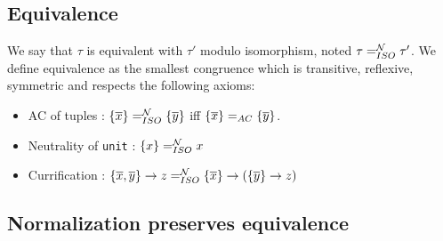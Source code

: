 \documentclass [a4paper,11pt]{scrartcl}
\newcommand{\N}{{\cal N}}
\newcommand\tlist{\overline}
\newcommand\tmset[1]{\{\overline{#1}\}}
\begin{document}
\subsection{Equivalence}

\newcommand\eqN{=^{\N}_{ISO}}
\newcommand\unifN{\equiv^{\N}_{ISO}}

We say that $\tau$ is equivalent with $\tau'$ modulo isomorphism, noted $\tau \eqN \tau'$. We define
equivalence as the smallest congruence which is transitive, reflexive, symmetric and respects the following axioms:


\begin{itemize}
\item AC of tuples : $\tmset{x} \eqN \tmset{y}$ iff $\tmset{x} \eqAC \tmset{y}$.
\item Neutrality of \texttt{unit} : $\{x\} \eqN x$
\item Currification : $\{\tlist{x},\tlist{y}\} \to z \eqN \tmset{x} \to (\tmset{y} \to z)$
\end{itemize}

\subsection{Normalization preserves equivalence}
\end{document}
